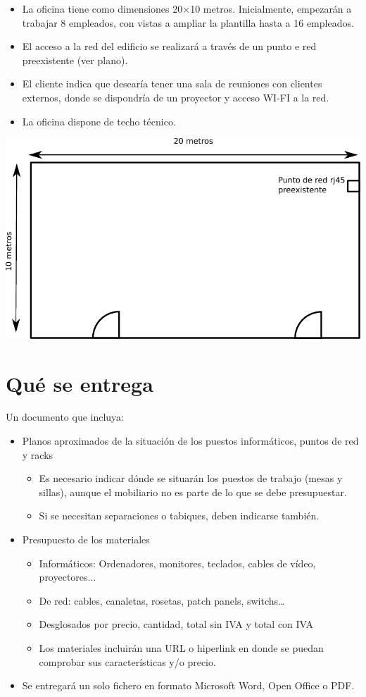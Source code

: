 \begin{itemize}
\item La oficina tiene como dimensiones 20$\times$10  metros. Inicialmente, empezarán a trabajar 8 empleados, con vistas a  ampliar la plantilla hasta a 16 empleados.
\item El acceso a la red del edificio se realizará a través de un punto e red preexistente (ver plano).
\item El cliente indica que desearía tener una sala de reuniones con clientes externos, donde se dispondría de un proyector y acceso WI-FI a la red.
\item La oficina dispone de techo técnico.
\end{itemize}
\begin{center}
  \includegraphics{media/plano-oficina.pdf}
\end{center}

\section{Qué se entrega}
Un documento que incluya:
\begin{itemize}
\item Planos aproximados de la situación de los puestos informáticos, puntos de red y racks
  \begin{itemize}
  \item Es necesario indicar dónde se situarán los puestos de trabajo (mesas y sillas), aunque el mobiliario no es
    parte de lo que se debe presupuestar.
  \item Si se necesitan separaciones o tabiques, deben indicarse también.
\end{itemize}
\item Presupuesto de los materiales
  \begin{itemize}
  \item Informáticos: Ordenadores, monitores, teclados, cables de vídeo, proyectores...
  \item De red: cables, canaletas, rosetas, patch panels, switchs…
  \item Desglosados por precio, cantidad, total sin IVA y total con IVA
  \item Los materiales incluirán una URL o hiperlink en donde se puedan comprobar sus características y/o precio.
\end{itemize}
\item Se entregará un solo fichero en formato Microsoft Word, Open Office o PDF.
\end{itemize}

